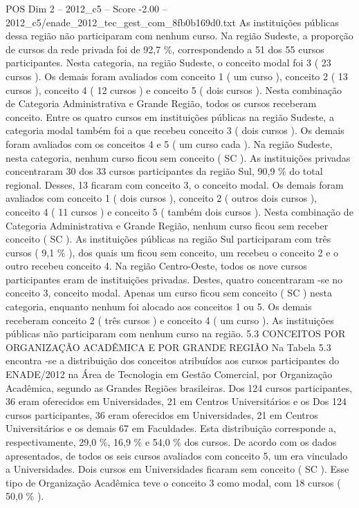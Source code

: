 \begin{textsample}{POS Dim 2 – 2012\_c5 – Score -2.00 – 2012\_c5/enade\_2012\_tec\_gest\_com\_8fb0b169d0.txt}
As instituições públicas dessa região não participaram com nenhum curso.
Na região Sudeste, a proporção de cursos da rede privada foi de 92,7 \%, correspondendo a 51 dos 55 cursos participantes.
Nesta categoria, na região Sudeste, o conceito modal foi 3 ( 23 cursos ).
Os demais foram avaliados com conceito 1 ( um curso ), conceito 2 ( 13 cursos ), conceito 4 ( 12 cursos ) e conceito 5 ( dois cursos ).
Nesta combinação de Categoria Administrativa e Grande Região, todos os cursos receberam conceito.
Entre os quatro cursos em instituições públicas na região Sudeste, a categoria modal também foi a que recebeu conceito 3 ( dois cursos ).
Os demais foram avaliados com os conceitos 4 e 5 ( um curso cada ).
Na região Sudeste, nesta categoria, nenhum curso ficou sem conceito ( SC ).
As instituições privadas concentraram 30 dos 33 cursos participantes da região Sul, 90,9 \% do total regional.
Desses, 13 ficaram com conceito 3, o conceito modal.
Os demais foram avaliados com conceito 1 ( dois cursos ), conceito 2 ( outros dois cursos ), conceito 4 ( 11 cursos ) e conceito 5 ( também dois cursos ).
Nesta combinação de Categoria Administrativa e Grande Região, nenhum curso ficou sem receber conceito ( SC ).
As instituições públicas na região Sul participaram com três cursos ( 9,1 \% ), dos quais um ficou sem conceito, um recebeu o conceito 2 e o outro recebeu conceito 4.
Na região Centro-Oeste, todos os nove cursos participantes eram de instituições privadas.
Destes, quatro concentraram -se no conceito 3, conceito modal.
Apenas um curso ficou sem conceito ( SC ) nesta categoria, enquanto nenhum foi alocado aos conceitos 1 ou 5.
Os demais receberam conceito 2 ( três cursos ) e conceito 4 ( um curso ).
As instituições públicas não participaram com nenhum curso na região. 5.3 CONCEITOS POR ORGANIZAÇÃO ACADÊMICA E POR GRANDE REGIÃO Na Tabela 5.3 encontra -se a distribuição dos conceitos atribuídos aos cursos participantes do ENADE/2012 na Área de Tecnologia em Gestão Comercial, por Organização Acadêmica, segundo as Grandes Regiões brasileiras.
Dos 124 cursos participantes, 36 eram oferecidos em Universidades, 21 em Centros Universitários e os Dos 124 cursos participantes, 36 eram oferecidos em Universidades, 21 em Centros Universitários e os demais 67 em Faculdades.
Esta distribuição corresponde a, respectivamente, 29,0 \%, 16,9 \% e 54,0 \% dos cursos.
De acordo com os dados apresentados, de todos os seis cursos avaliados com conceito 5, um era vinculado a Universidades.
Dois cursos em Universidades ficaram sem conceito ( SC ).
Esse tipo de Organização Acadêmica teve o conceito 3 como modal, com 18 cursos ( 50,0 \% ).

\end{textsample}
